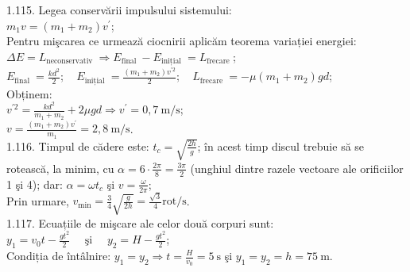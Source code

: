 1.115. Legea conservării impulsului sistemului:\\ $m_{1} v=\left(m_{1}+m_{2}\right) v^{\prime}$;\\ Pentru mişcarea ce urmează ciocnirii aplicăm teorema variației energiei:\\ $\Delta E=L_{\text {neconservativ }} \Rightarrow E_{\text {final }}-E_{\text {inițial }}=L_{\text {frecare }}$;\\ $E_{\text {final }}=\frac{k d^{2}}{2}; \quad E_{\text {inițial }}=\frac{\left(m_{1}+m_{2}\right) v^{\prime 2}}{2}; \quad L_{\text {frecare }}=-\mu\left(m_{1}+m_{2}\right) g d$;\\ Obținem:\\ $v^{\prime 2}=\frac{k d^{2}}{m_{1}+m_{2}}+2 \mu g d \Rightarrow v^{\prime}=0,7 \mathrm{~m} / \mathrm{s}$;\\ $v=\frac{\left(m_{1}+m_{2}\right) v^{\prime}}{m_{1}}=2,8 \mathrm{~m} / \mathrm{s}$.\\

1.116. Timpul de cădere este: $t_{c}=\sqrt{\frac{2 h}{g}}$; în acest timp discul trebuie să se rotească, la minim, cu $\alpha=6 \cdot \frac{2 \pi}{8}=\frac{3 \pi}{2}$ (unghiul dintre razele vectoare ale orificiilor 1 şi 4); dar: $\alpha=\omega t_{c}$ şi $v=\frac{\omega}{2 \pi}$;\\ Prin urmare, $v_{\min }=\frac{3}{4} \sqrt{\frac{g}{2 h}}=\frac{\sqrt{3}}{4} \mathrm{rot} / \mathrm{s}$.\\

1.117. Ecuațiile de mişcare ale celor două corpuri sunt:\\ $y_{1}=v_{0} t-\frac{g t^{2}}{2} \quad \text { şi } \quad y_{2}=H-\frac{g t^{2}}{2}$;\\ Condiția de întâlnire: $y_{1}=y_{2} \Rightarrow t=\frac{H}{v_{0}}=5 \mathrm{~s}$ şi $y_{1}=y_{2}=h=75 \mathrm{~m}$.\\

